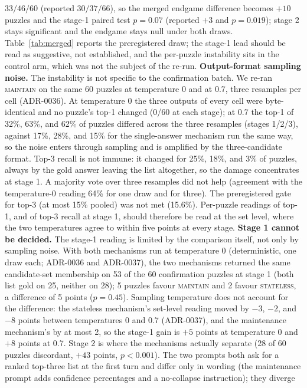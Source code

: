 \documentclass[10pt]{article}
\newcommand{\Mstate}{\textsc{stateless}}
\newcommand{\Mmaint}{\textsc{maintain}}
\begin{document}
$33/46/60$ (reported $30/37/66$), so the merged endgame difference becomes
$+10$ puzzles and the stage-1 paired test $p = 0.07$ (reported $+3$ and
$p = 0.019$); stage 2 stays significant and the endgame stays null under
both draws. Table~\ref{tab:merged} reports the preregistered draw; the
stage-1 lead should be read as suggestive, not established, and the
per-puzzle instability sits in the control arm, which was not the subject
of the re-run. \textbf{Output-format sampling noise.} The instability is
not specific to the confirmation batch. We re-ran \Mmaint{} on the same
60 puzzles at temperature 0 and at 0.7, three resamples per cell
(ADR-0036). At temperature 0 the three outputs of every cell were
byte-identical and no puzzle's top-1 changed (0/60 at each stage); at
0.7 the top-1 of 32\%, 63\%, and 62\% of puzzles differed across the
three resamples (stages 1/2/3), against 17\%, 28\%, and 15\% for the
single-answer mechanism run the same way, so the noise enters through
sampling and is amplified by the three-candidate format. Top-3 recall
is not immune: it changed for 25\%, 18\%, and 3\% of puzzles, always by
the gold answer leaving the list altogether, so the damage concentrates
at stage 1. A majority vote over three resamples did not help (agreement
with the temperature-0 reading 64\% for one draw and for three). The
preregistered gate for top-3 (at most 15\% pooled) was not met (15.6\%).
Per-puzzle readings of top-1, and of top-3 recall at stage 1, should
therefore be read at the set level, where the two temperatures agree to
within five points at every stage. \textbf{Stage 1 cannot be decided.}
The stage-1 reading is limited by the comparison itself, not only by
sampling noise. With both mechanisms run at temperature 0 (deterministic,
one draw each; ADR-0036 and ADR-0037), the two mechanisms returned the
same candidate-set membership on 53 of the 60 confirmation puzzles at
stage 1 (both list gold on 25, neither on 28); 5 puzzles favour \Mmaint{}
and 2 favour \Mstate{}, a difference of 5 points ($p = 0.45$). Sampling
temperature does not account for the difference: the stateless
mechanism's set-level reading moved by $-3$, $-2$, and $-8$ points
between temperatures 0 and 0.7 (ADR-0037), and the maintenance
mechanism's by at most 2, so the stage-1 gain is $+5$ points at
temperature 0 and $+8$ points at 0.7. Stage 2 is where the mechanisms
actually separate (28 of 60 puzzles discordant, $+43$ points, $p <
0.001$). The two prompts both ask for a ranked top-three list at the
first turn and differ only in wording (the maintenance prompt adds
confidence percentages and a no-collapse instruction); they diverge
\end{document}
